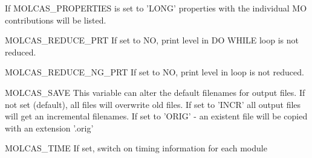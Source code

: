\begin{variablelist}
If MOLCAS\_PROPERTIES is set to 'LONG' properties with the individual MO contributions will be listed.
\item[MOLCAS\_REDUCE\_PRT]
If set to NO, print level in DO WHILE loop is not reduced.
\item[MOLCAS\_REDUCE\_NG\_PRT]
If set to NO, print level in  loop is not reduced.
\item[MOLCAS\_SAVE]
This variable can alter the default filenames for output files.
If not set (default), all files will overwrite old files.
If set to 'INCR' all output files will get an incremental
filenames.
If set to 'ORIG' - an existent file will be copied with
an extension '.orig'

\item[MOLCAS\_TIME]
If set, switch on timing information for each module


\end{variablelist}

